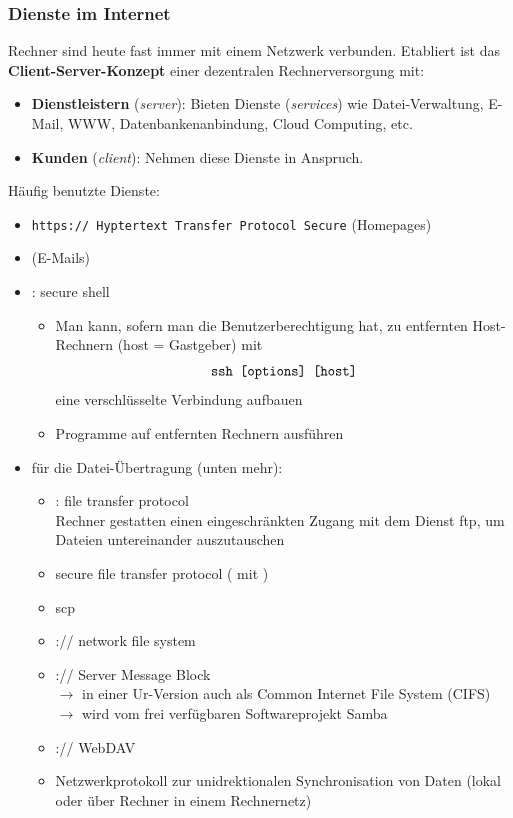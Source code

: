\subsubsection{Dienste im Internet}
Rechner sind heute fast immer mit einem Netzwerk verbunden. Etabliert ist das \textbf{Client-Server-Konzept} einer dezentralen Rechnerversorgung mit:
\begin{itemize}
	\item \textbf{Dienstleistern} (\textit{server}): Bieten Dienste (\textit{services}) wie Datei-Verwaltung, E-Mail, WWW, Datenbankenanbindung, Cloud Computing, etc.
	\item \textbf{Kunden} (\textit{client}): Nehmen diese Dienste in Anspruch.
\end{itemize}
Häufig benutzte Dienste:
\begin{itemize}
	\item \texttt{https:// Hyptertext Transfer Protocol Secure} (Homepages)
	\item {} (E-Mails)
	\item {}: secure shell
	\begin{itemize}
		\item Man kann, sofern man die Benutzerberechtigung hat, zu entfernten Host-Rechnern (host = Gastgeber) mit
			$$\texttt{ssh [options] [host]}$$
		eine verschlüsselte Verbindung aufbauen
		\item Programme auf entfernten Rechnern ausführen
	\end{itemize}
	\item für die Datei-Übertragung (unten mehr):
	\begin{itemize}
		\item  {}: file transfer protocol \\
		Rechner gestatten einen eingeschränkten Zugang mit dem Dienst ftp, um Dateien untereinander auszutauschen
		\item {} secure file transfer protocol ( mit )
		\item scp
		\item {}:// network file system
		\item {}:// Server Message Block\\ 
		$\to$ in einer Ur-Version auch als Common Internet File System (CIFS)\\
		$\to$ wird vom frei verfügbaren Softwareprojekt Samba
		\item {}:// WebDAV
		\item {}  Netzwerkprotokoll zur unidrektionalen Synchronisation von Daten (lokal oder über Rechner in einem Rechnernetz)\\

\end{itemize}
\end{itemize}
